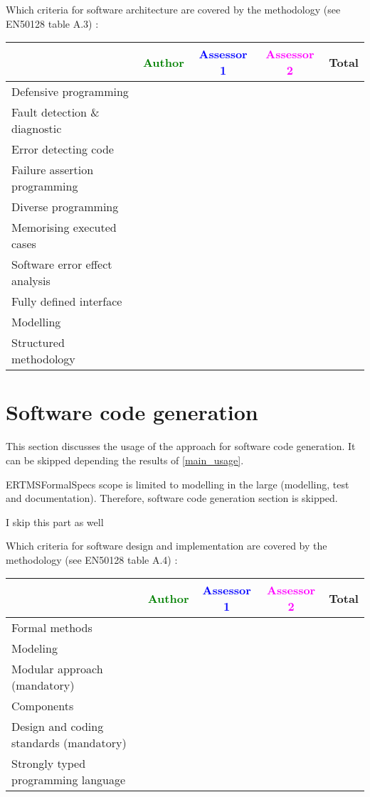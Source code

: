 Which criteria for software architecture are covered by the methodology
(see EN50128 table A.3) :

\begin{tabular}{|l | c | c | c | c|}
\hline
& \textcolor{green}{Author} & \textcolor{blue}{Assessor 1} & \textcolor{magenta}{Assessor 2} & Total \\
\hline
Defensive programming  & & & &  \\
\hline 
Fault detection \& diagnostic  & & & &  \\
\hline
Error detecting code  & & & &  \\
\hline
Failure assertion programming & & & &  \\
\hline
Diverse programming & & & &  \\
\hline
Memorising executed cases & & & &  \\
\hline
Software error effect analysis & & & &  \\
\hline
Fully defined interface & & & &  \\
\hline
Modelling  & & & &  \\
\hline
Structured methodology & & & &  \\
\hline
\end{tabular}

\section{Software code generation}
This section discusses the usage of the approach for software code generation.
It can be skipped depending the results of \ref{main_usage}.

\begin{author_comment}
ERTMSFormalSpecs scope is limited to modelling in the large (modelling, test and documentation). Therefore, software code generation section is skipped.  
\end{author_comment}

\begin{assessor1}
I skip this part as well
\end{assessor1}

Which criteria for software design and implementation are covered by the methodology
(see EN50128 table A.4) :

\begin{tabular}{|l | c | c | c | c|}
\hline
& \textcolor{green}{Author} & \textcolor{blue}{Assessor 1} & \textcolor{magenta}{Assessor 2} & Total \\
\hline
Formal methods  & & & &  \\
\hline 
Modeling  & & & &  \\
\hline
Modular approach (mandatory) & & & &  \\
\hline
Components & & & &  \\
\hline
Design and coding standards (mandatory) & & & &  \\
\hline
Strongly typed programming language & & & &  \\
\hline

\end{tabular}

